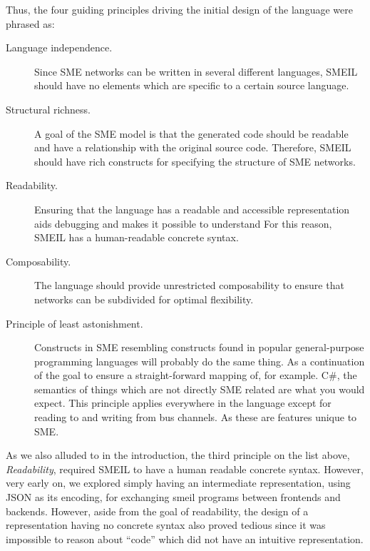 

Thus, the four guiding principles driving the initial design of the language
were phrased as:
\begin{description}
\item[Language independence.] Since SME networks can be written in several
  different languages, SMEIL should have no elements which are specific to a
  certain source language.
\item[Structural richness.] A goal of the SME model is that the generated code
  should be readable and have a relationship with the original source
  code. Therefore, SMEIL should have rich constructs for specifying the
  structure of SME networks.
\item[Readability.] Ensuring that the language has a readable and accessible
  representation aids debugging and makes it possible to understand For this
  reason, SMEIL has a human-readable concrete syntax.
\item[Composability.] The language should provide unrestricted composability to
  ensure that networks can be subdivided for optimal flexibility.
\item[Principle of least astonishment.] Constructs in SME resembling constructs
  found in popular general-purpose programming languages will probably do the
  same thing. As a continuation of the goal to ensure a straight-forward mapping
  of, for example. C\#, the semantics of things which are not directly SME
  related are what you would expect. This principle applies everywhere in the
  language except for reading to and writing from bus channels. As these are
  features unique to SME.
\end{description}



 As we also alluded to in the introduction, the third principle on
the list above, {\itshape Readability}, required SMEIL to have a human readable
concrete syntax. However, very early on, we explored simply having an
intermediate representation, using JSON as its encoding, for exchanging
\gls{smeil} programs between frontends and backends. However, aside from the
goal of readability, the design of a representation having no concrete syntax
also proved tedious since it was impossible to reason about ``code'' which did
not have an intuitive representation.

